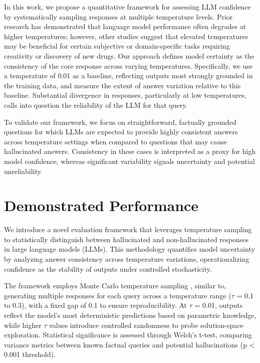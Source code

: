 \documentclass[sigconf]{acmart}
\begin{document}
In this work, we propose a quantitative framework for assessing LLM confidence by systematically sampling responses at multiple temperature levels. Prior research has demonstrated that language model performance often degrades at higher temperatures; however, other studies suggest that elevated temperatures may be beneficial for certain subjective or domain-specific tasks \cite{hallucinations_drug,temperature_effect,detecting_hallucinations} requiring creativity or discovery of new drugs. Our approach defines model certainty as the consistency of the core response across varying temperatures. Specifically, we use a temperature of 0.01 as a baseline, reflecting outputs most strongly grounded in the training data, and measure the extent of answer variation relative to this baseline. Substantial divergence in responses, particularly at low temperatures, calls into question the reliability of the LLM for that query.

To validate our framework, we focus on straightforward, factually grounded questions for which LLMs are expected to provide highly consistent answers across temperature settings when compared to questions that may cause hallucinated answers.
Consistency in these cases is interpreted as a proxy for high model confidence, whereas significant variability signals uncertainty and potential unreliability.


\section{Demonstrated Performance}

We introduce a novel evaluation framework that leverages temperature sampling to statistically distinguish between hallucinated and non-hallucinated responses in large language models (LLMs). This methodology quantifies model uncertainty by analyzing answer consistency across temperature variations, operationalizing confidence as the stability of outputs under controlled stochasticity.

The framework employs Monte Carlo temperature sampling \cite{monte_carlo_temperature}, similar to, generating multiple responses for each query across a temperature range ($\tau$ = 0.1 to 0.3), with a fixed gap of 0.1 to ensure reproducibility. At $\tau$ = 0.01, outputs reflect the model's most deterministic predictions based on parametric knowledge, while higher $\tau$ values introduce controlled randomness to probe solution-space exploration. Statistical significance is assessed through Welch's t-test, comparing variance metrics between known factual queries and potential hallucinations (p < 0.001 threshold).
\end{document}
